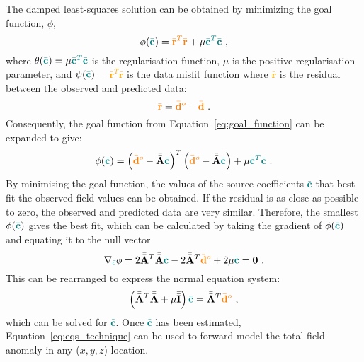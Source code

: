 The damped least-squares solution can be obtained by minimizing the goal function, $\phi$, 
\begin{equation}
\label{eq:goal_function}
    \phi(\textcolor{teal}{\bar{\mathbf{c}}}) = \textcolor{orange}{\bar{\mathbf{r}}^T\bar{\mathbf{r}}} + \mu \textcolor{teal}{\bar{\mathbf{c}}^T\bar{\mathbf{c}}}
    \ ,
\end{equation}
where $\theta(\textcolor{teal}{\bar{\mathbf{c}}}) = \mu \textcolor{teal}{\bar{\mathbf{c}}^T\bar{\mathbf{c}}}$ is the regularisation function, $\mu$ is the positive regularisation parameter, and $\psi(\textcolor{teal}{\bar{\mathbf{c}}}) =$ \textcolor{orange}{$\bar{\mathbf{r}}^T\bar{\mathbf{r}}$} is the data misfit function where \textcolor{orange}{$\bar{\mathbf{r}}$} is the residual between the observed and predicted data:
\begin{equation}
    \label{eqs:resdiual}
    \textcolor{orange}{\bar{\mathbf{r}}} = \textcolor{orange}{\bar{\mathbf{d}}^o} - \textcolor{orange}{\bar{\mathbf{d}}}
    \ .
\end{equation}
Consequently, the goal function from Equation~\ref{eq:goal_function} can  be expanded to give:
\begin{equation}
    \phi (\textcolor{teal}{\bar{\mathbf{c}}}) = \left(\textcolor{orange}{\bar{\mathbf{d}}^o} - \Bar{\Bar{\mathbf{A}}} \textcolor{teal}{\bar{\mathbf{c}}}\right)^T \left(\textcolor{orange}{\bar{\mathbf{d}}^o} - \Bar{\Bar{\mathbf{A}}} \textcolor{teal}{\bar{\mathbf{c}}}\right) + \mu \textcolor{teal}{\bar{\mathbf{c}}^T\bar{\mathbf{c}}}
    \ .
\end{equation}
By minimising the goal function, the values of the source coefficients \textcolor{teal}{$\bar{\mathbf{c}}$} that best fit the observed field values can be obtained. If the residual is as close as possible to zero, the observed and predicted data are very similar. Therefore, the smallest $\phi(\textcolor{teal}{\bar{\mathbf{c}}})$
gives the best fit, which can be calculated by taking the gradient of $\phi(\textcolor{teal}{\bar{\mathbf{c}}})$ and equating it to the null vector
\begin{equation}
    \nabla_{\textcolor{teal}{\bar{c}}} \phi = 2 \Bar{\Bar{\mathbf{A}}}^T \Bar{\Bar{\mathbf{A}}} \textcolor{teal}{\Bar{\mathbf{c}}} - 2\Bar{\Bar{\mathbf{A}}}^T\textcolor{orange}{\bar{\mathbf{d}}^o} + 2\mu \textcolor{teal}{\bar{\mathbf{c}}} = \bar{\mathbf{0}}
    \ .
\end{equation}
This can be rearranged to express the normal equation system:
\begin{equation}
    \left( \Bar{\Bar{\mathbf{A}}}^T \Bar{\Bar{\mathbf{A}}} +  \mu \bar{\bar{\mathbf{I}}} \right) \textcolor{teal}{\bar{\mathbf{c}}} = 
    \Bar{\Bar{\mathbf{A}}}^T\textcolor{orange}{\bar{\mathbf{d}}^o}
    \ ,
    \label{eq:normal_equations}
\end{equation}
which can be solved for \textcolor{teal}{$\bar{\mathbf{c}}$}. Once \textcolor{teal}{$\bar{\mathbf{c}}$} has been estimated, Equation~\ref{eq:eqs_technique} can be used to forward model the total-field anomaly in any ($x, y, z$) location.

